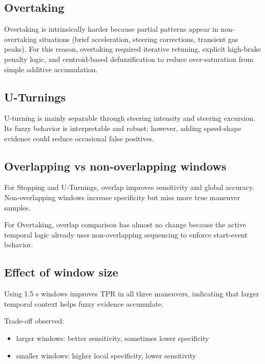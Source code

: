\documentclass[11pt,a4paper]{article}
\begin{document}
\subsection{Overtaking}
Overtaking is intrinsically harder because partial patterns appear in non-overtaking situations (brief acceleration, steering corrections, transient gas peaks). For this reason, overtaking required iterative retuning, explicit high-brake penalty logic, and centroid-based defuzzification to reduce over-saturation from simple additive accumulation.

\subsection{U-Turnings}
U-turning is mainly separable through steering intensity and steering excursion. Its fuzzy behavior is interpretable and robust; however, adding speed-shape evidence could reduce occasional false positives.

\subsection{Overlapping vs non-overlapping windows}
For Stopping and U-Turnings, overlap improves sensitivity and global accuracy. Non-overlapping windows increase specificity but miss more true maneuver samples.

For Overtaking, overlap comparison has almost no change because the active temporal logic already uses non-overlapping sequencing to enforce start-event behavior.

\subsection{Effect of window size}
Using 1.5 s windows improves TPR in all three maneuvers, indicating that larger temporal context helps fuzzy evidence accumulate.

Trade-off observed:
\begin{itemize}
    \item larger windows: better sensitivity, sometimes lower specificity
    \item smaller windows: higher local specificity, lower sensitivity
\end{itemize}
\end{document}
